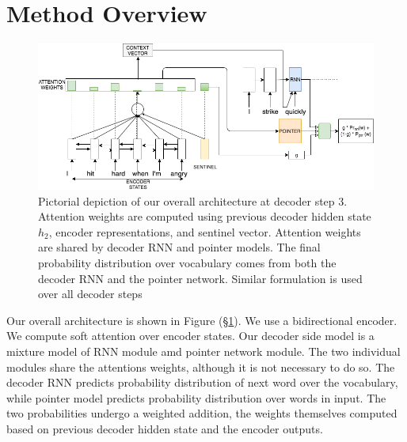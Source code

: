 
\section{Method Overview} \label{sec:Method}

\begin{figure}
\centering
\includegraphics[scale=0.50]{images/StyleTransferGangalVersion.png}
\caption{Pictorial depiction of our overall architecture at decoder step 3. Attention weights are computed using previous decoder hidden state $h_2$, encoder representations, and sentinel vector. Attention weights are shared by decoder RNN and pointer models. The final probability distribution over vocabulary comes from both the decoder RNN and the pointer network. Similar formulation is used over all decoder steps }
\label{fig:architecture}
\end{figure}


Our overall architecture is shown in Figure (\S\ref{fig:architecture}). We use a bidirectional encoder. We compute soft attention over encoder states. Our decoder side model is a mixture model of RNN module amd pointer network module. The two individual modules share the attentions weights, although it is not necessary to do so. The decoder RNN predicts probability distribution of next word over the vocabulary, while pointer model predicts probability distribution over words in input. The two probabilities undergo a weighted addition, the weights themselves computed based on previous decoder hidden state and the encoder outputs. 


